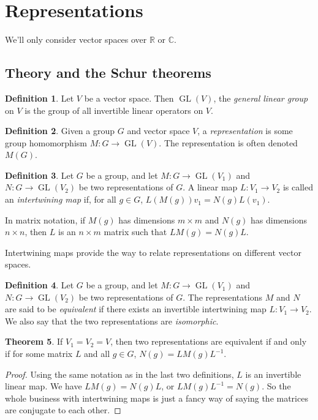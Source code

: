 \documentclass[12pt, letterpaper]{article}
\theoremstyle{definition} %
\newtheorem{thm}{Theorem}[section] %
\newtheorem{defn}[thm]{Definition} %
\def\GL{\operatorname{GL}}
\begin{document}
\section{Representations}
We'll only consider vector spaces over $\mathbb{R}$ or $\mathbb{C}$.
\subsection{Theory and the Schur theorems}

\begin{defn}
  Let $V$ be a vector space. Then $\GL(V)$, the \emph{general linear group} on $V$ is the group of all invertible linear operators on $V$.
\end{defn}
\begin{defn}
  Given a group $G$ and vector space $V$, a \emph{representation} is some group homomorphism $M:G\to \GL(V)$. 
  The representation is often denoted $M(G)$.
\end{defn}

\begin{defn}
  \label{intertwining}
  Let $G$ be a group, and let $M:G\to \GL(V_1)$ and $N:G\to \GL(V_2)$ be two
  representations of $G$. A linear map $L:V_1\to V_2$ is called an \emph{intertwining map}
  if, for all $g\in G$, $L(M(g))v_1=N(g) L(v_1)$. 

  In matrix notation, if $M(g)$ has dimensions $m\times m$ and $N(g)$ has dimensions $n\times n$, 
  then $L$ is an $n\times m$ matrix such that $L M(g)=N(g)L$.

  Intertwining maps provide the way to relate representations on different vector spaces.
\end{defn}

\begin{defn}
  \label{equivalent}
  Let $G$ be a group, and let $M:G\to \GL(V_1)$ and $N:G\to \GL(V_2)$ be two
  representations of $G$. The representations $M$ and $N$ are said to be \emph{equivalent}
  if there exists an invertible intertwining map $L:V_1\to V_2$. We also say that the two representations
  are \emph{isomorphic}.
\end{defn}

\begin{thm}
  If $V_1=V_2=V$, then two representations are equivalent if and only if for some 
  matrix $L$ and all $g\in G$, $N(g)=L M(g)L^{-1}$. 
\end{thm}
\begin{proof}
  Using the same notation as in the last two definitions, $L$ is an 
  invertible linear map. We have $L M(g)=N(g) L$, or $L M(g)L^{-1}=N(g)$. 
  So the whole business with intertwining maps is just a fancy way of saying the matrices are
  conjugate to each other.
\end{proof}
\end{document}
